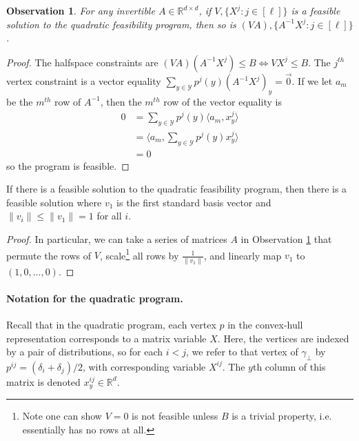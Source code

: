 \documentclass[anon]{colt2020} %
\newcommand{\Comments}{1}
\newcommand{\mynote}[2]{\ifnum\Comments=1\textcolor{#1}{#2}\fi}
\newcommand{\jessie}[1]{\mynote{purple}{[JF: #1]}}
\newcommand{\reals}{\mathbb{R}}
\newcommand{\Y}{\mathcal{Y}}
\newcommand{\ellabs}[1]{\ell_{#1}}
\newcommand{\inprod}[2]{\langle #1, #2 \rangle}%
\newtheorem{observation}{Observation}
\begin{document}
\begin{observation} \label{obs:qfp-invariant-lin}
	For any invertible $A \in \reals^{d \times d}$, if $V,\{X^j : j \in [\ell]\}$ is a feasible solution to the quadratic feasibility program, then so is $(VA),\{A^{-1}X^j : j \in [\ell]\}$.
\end{observation}
\begin{proof}
	The halfspace constraints are $(VA)(A^{-1}X^j) \leq B \iff VX^{j} \leq B$.
	The $j^{th}$ vertex constraint is a vector equality $\sum_{y \in \Y} p^j(y) (A^{-1}X^j)_y = \vec{0}$.
	If we let $a_m$ be the $m^{th}$ row of $A^{-1}$, then the $m^{th}$ row of the vector equality is
	\begin{align*}
	0 &= \sum_{y \in \Y} p^j(y) \inprod{a_m}{x^j_y}  \\
	&= \inprod{a_m}{\sum_{y \in \Y} p^j(y) x^j_y}  \\
	&= 0
	\end{align*}
	so the program is feasible.
\end{proof}

\begin{corollary} \label{cor:qfp-wlog-v1}
	If there is a feasible solution to the quadratic feasibility program, then there is a feasible solution where $v_1$ is the first standard basis vector and $\|v_i\| \leq \|v_1\| = 1$ for all $i$.
\end{corollary}
\begin{proof}
	In particular, we can take a series of matrices $A$ in Observation \ref{obs:qfp-invariant-lin} that permute the rows of $V$, scale\footnote{Note one can show $V = 0$ is not feasible unless $B$ is a trivial property, i.e. essentially has no rows at all.} all rows by $\frac{1}{\|v_1\|}$, and linearly map $v_1$ to $(1,0,\dots,0)$.
\end{proof}

\paragraph{Notation for the quadratic program.}
Recall that in the quadratic program, each vertex $p$ in the convex-hull representation corresponds to a matrix variable $X$.
Here, the vertices are indexed by a pair of distributions, so for each $i < j$, we refer to that vertex of $\gamma_{\bot}$ by $p^{ij} = (\delta_i + \delta_j)/2$, with corresponding variable $X^{ij}$.
The $y$th column of this matrix is denoted $x^{ij}_y \in \reals^d$.
\end{document}
